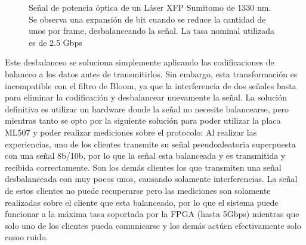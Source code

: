 \begin{figure}[!t]
   \centering
   \qquad
   \qquad
  \caption {Señal de potencia óptica de un Láser XFP Sumitomo de 1330 nm. Se observa una expansión de bit cuando se reduce la cantidad de unos por frame, desbalanceando la señal. La tasa nominal utilizada es de 2.5 Gbps}
  \label{fig:ImgExpansion}
\end{figure}

Este desbalanceo se soluciona simplemente aplicando las codificaciones de balanceo a los datos antes de transmitirlos. Sin embargo, esta transformación es incompatible con el filtro de Bloom, ya que la interferencia de dos señales basta para eliminar la codificación y desbalancear nuevamente la señal. La solución definitiva es utilizar un hardware donde la señal no necesite balancearse, pero mientras tanto se opto por la siguiente solución para poder utilizar la placa ML507 y poder realizar mediciones sobre el protocolo: Al realizar las experiencias, uno de los clientes transmite su señal pseudoaleatoria superpuesta con una señal 8b/10b, por lo que la señal esta balanceada y es transmitida y recibida correctamente. Son los demás clientes los que transmiten una señal desbalanceada con muy pocos unos, causando solamente interferencias. La señal de estos clientes no puede recuperarse pero las mediciones son solamente realizadas sobre el cliente que esta balanceado, por lo que el sistema puede funcionar a la máxima tasa soportada por la FPGA (hasta 5Gbps) mientras que solo uno de los clientes pueda comunicarse y los demás actúen efectivamente solo como ruido.

